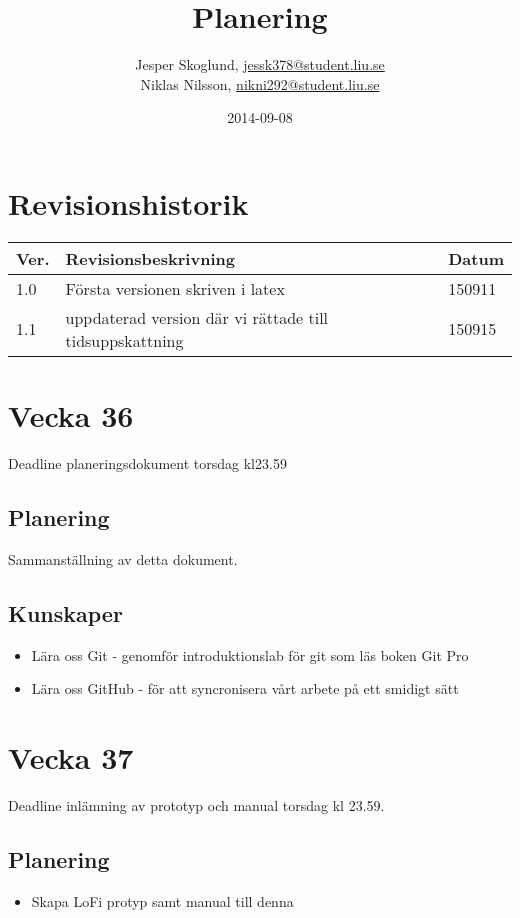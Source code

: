 \documentclass{TDP003mall}
\author{Jesper Skoglund, \url{jessk378@student.liu.se}\\
  Niklas Nilsson, \url{nikni292@student.liu.se}}
\title{Planering}
\date{2014-09-08}
\begin{document}
\projectpage
\section{Revisionshistorik}
\begin{table}[!h]
\begin{tabularx}{\linewidth}{|l|X|l|}
\hline
Ver. & Revisionsbeskrivning & Datum \\\hline
1.0 & Första versionen skriven i latex & 150911 \\\hline
1.1 & uppdaterad version där vi rättade till tidsuppskattning & 150915 \\\hline
\end{tabularx}
\end{table}


\section{Vecka 36}
Deadline planeringsdokument torsdag kl23.59\\

\subsection{Planering}
Sammanställning av detta dokument.

\subsection{Kunskaper}

\begin{itemize}
\item Lära oss Git - genomför introduktionslab för git som läs boken Git Pro
\item Lära oss GitHub - för att syncronisera vårt arbete på ett smidigt sätt
\end{itemize}

\section{Vecka 37}
Deadline inlämning av prototyp och manual torsdag kl 23.59.\\

\subsection{Planering}
\begin{itemize}
\item Skapa LoFi protyp samt manual till denna
\end{itemize}
\end{document}
